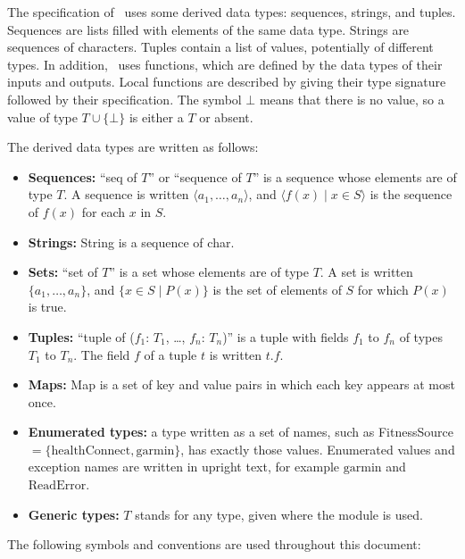 \documentclass[12pt, titlepage]{article}
\begin{document}
\noindent
The specification of \progname \ uses some derived data types: sequences, strings, and
tuples. Sequences are lists filled with elements of the same data type. Strings
are sequences of characters. Tuples contain a list of values, potentially of
different types. In addition, \progname \ uses functions, which
are defined by the data types of their inputs and outputs. Local functions are
described by giving their type signature followed by their specification.
The symbol $\bot$ means that there is no value, so a value of type $T \cup
\{\bot\}$ is either a $T$ or absent.

\noindent
The derived data types are written as follows:
\begin{itemize}
\item \textbf{Sequences:} ``seq of $T$'' or ``sequence of $T$'' is a sequence
  whose elements are of type $T$. A sequence is written $\langle a_1, \ldots,
  a_n \rangle$, and $\langle f(x) \mid x \in S \rangle$ is the sequence of
  $f(x)$ for each $x$ in $S$.
\item \textbf{Strings:} String is a sequence of char.
\item \textbf{Sets:} ``set of $T$'' is a set whose elements are of type $T$. A
  set is written $\{a_1, \ldots, a_n\}$, and $\{x \in S \mid P(x)\}$ is the
  set of elements of $S$ for which $P(x)$ is true.
\item \textbf{Tuples:} ``tuple of ($f_1$: $T_1$, \ldots, $f_n$: $T_n$)'' is a
  tuple with fields $f_1$ to $f_n$ of types $T_1$ to $T_n$. The field $f$ of a
  tuple $t$ is written $t.f$.
\item \textbf{Maps:} Map is a set of key and value pairs in which each key
  appears at most once.
\item \textbf{Enumerated types:} a type written as a set of names, such as
  FitnessSource $= \{\mathrm{healthConnect}, \mathrm{garmin}\}$, has exactly
  those values. Enumerated values and exception names are written in upright
  text, for example $\mathrm{garmin}$ and $\mathrm{ReadError}$.
\item \textbf{Generic types:} $T$ stands for any type, given where the module
  is used.
\end{itemize}

\noindent
The following symbols and conventions are used throughout this document:
\end{document}

